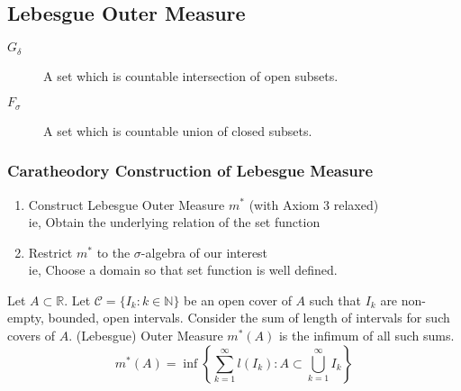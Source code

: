\subsection{Lebesgue Outer Measure}
\begin{description}
	\item[$G_\delta$] A set which is countable intersection of open subsets.
	\item[$F_\sigma$] A set which is countable union of closed subsets.
\end{description}

\subsubsection{Caratheodory Construction of Lebesgue Measure}
\begin{enumerate}
	\item Construct Lebesgue Outer Measure $m^\ast$ (with Axiom 3 relaxed) \\
		ie, Obtain the underlying relation of the set function
	\item Restrict $m^\ast$ to the $\sigma$-algebra of our interest \\
		ie, Choose a domain so that set function is well defined.
\end{enumerate}
\begin{definition}
	Let $A \subset \mathbb{R}$.
	Let $\mathcal{C} = \{ I_k : k \in \mathbb{N}\}$ be an open cover of $A$ such that $I_k$ are non-empty, bounded, open intervals.
	Consider the sum of length of intervals for such covers of $A$.
	(Lebesgue) Outer Measure $m^\ast(A)$ is the infimum of all such sums.
\begin{equation}
	 m^\ast(A) = \inf \left\{ \sum_{k=1}^\infty l(I_k) : A \subset \bigcup_{k=1}^\infty I_k \right\} 
	 \label{eq:outermeasure}
\end{equation}
\end{definition}
